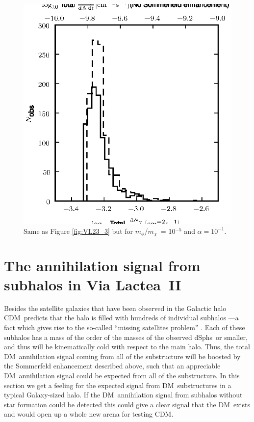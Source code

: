\documentclass[aps,prd,twocolumn,amsmath,amssymb,floatfix,nofootinbib,10pt]{revtex4}
\newcommand{\VL}{Via Lactea}
\newcommand{\CDM}{CDM}
\newcommand{\DM}{DM}
\newcommand{\mdm}{\ensuremath{m_{\chi}}}
\newcommand{\mv}{\ensuremath{m_{\phi}}}
\newcommand{\dSphs}{dSphs}
\begin{document}
\begin{figure}
\centering
\includegraphics{hist_-5_-1_10_3.eps}
\caption{Same as Figure \ref{fig:VL23_3} but for \mv/\mdm\ = 10$^{-5}$
and $\alpha = 10^{-1}$.}%
\label{fig:VL51_2}%
\end{figure}










\section{The annihilation signal from subhalos in \VL\ II}

Besides the satellite galaxies that have been observed in the Galactic
halo \CDM\ predicts that the halo is filled with hundreds of
individual subhalos ---a fact which gives rise to the so-called
``missing satellites problem''
\cite{1999ApJ...522...82K,1999ApJ...524L..19M}. Each of these subhalos
has a mass of the order of the masses of the observed \dSphs\ or
smaller, and thus will be kinematically cold with respect to the main
halo. Thus, the total \DM\ annihilation signal coming from all of the
substructure will be boosted by the Sommerfeld enhancement described
above, such that an appreciable \DM\ annihilation signal could be
expected from all of the substructure. In this section we get a
feeling for the expected signal from \DM\ substructures in a typical
Galaxy-sized halo. If the \DM\ annihilation signal from subhalos
without star formation could be detected this could give a clear
signal that the \DM\ exists and would open up a whole new arena for
testing \CDM.
\end{document}
